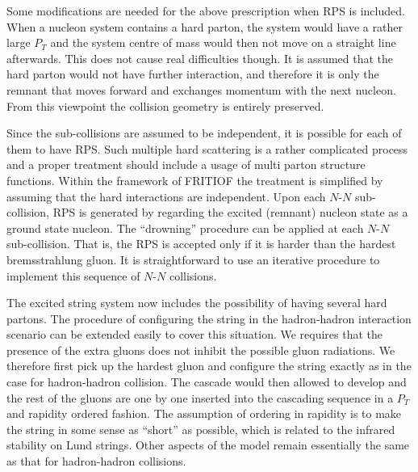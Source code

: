 Some modifications are needed for the above prescription when RPS is
included.  When a nucleon system contains a hard parton, the system would
have a rather large $P_T$ and the system centre of mass would then not
move on a straight line afterwards.  This does not cause real difficulties
though.  It is assumed that the hard parton would not have further interaction,
and therefore it is only the remnant that moves forward and exchanges
momentum with the next nucleon.  From this viewpoint the collision geometry
is entirely preserved.  

Since the sub-collisions are assumed to be independent, 
it is possible for each of them to have RPS.  Such multiple hard
scattering is a rather complicated process and a proper treatment
should include a usage of multi parton structure functions.
Within the framework of FRITIOF the treatment is simplified by
assuming that the hard interactions are independent.  Upon
each $N$-$N$ sub-collision, RPS is generated by regarding the excited
(remnant) nucleon state as a ground state nucleon. 
The ``drowning'' procedure can be applied at each $N$-$N$ sub-collision. 
That is, the RPS is accepted only if it is harder than the 
hardest bremsstrahlung gluon.    
It is straightforward to use an iterative procedure
to implement this sequence of $N$-$N$ collisions.  
   
The excited string system now includes the possibility of having several 
hard partons.  
The procedure of configuring the string in the hadron-hadron
interaction scenario can be extended easily to cover this situation. 
We requires that the presence of the extra gluons does not inhibit
the possible gluon radiations.  We therefore first pick up the
hardest gluon and configure the string exactly as in the case for 
hadron-hadron collision.  The cascade would then allowed to develop
and the rest of the gluons are one by one 
inserted into the cascading sequence in a $P_T$ and rapidity ordered fashion.
The assumption of ordering in rapidity is to make the string in some sense
as ``short'' as possible, which is related to the infrared stability on Lund strings.  Other aspects of the model remain 
essentially the same as that for hadron-hadron collisions.

